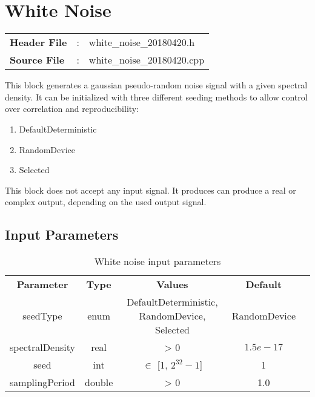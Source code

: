 \clearpage

\section{White Noise}

\begin{tcolorbox}	
	\begin{tabular}{p{2.75cm} p{0.2cm} p{10.5cm}} 	
		\textbf{Header File}   &:& white\_noise\_20180420.h \\
		\textbf{Source File}   &:& white\_noise\_20180420.cpp \\
	\end{tabular}
\end{tcolorbox}

\maketitle
This block generates a gaussian pseudo-random noise signal with a given spectral density. It can be initialized with three different seeding methods to allow control over correlation and reproducibility:

\begin{enumerate}
	\item DefaultDeterministic
	\item RandomDevice
	\item Selected
\end{enumerate}

This block does not accept any input signal. It produces can produce a real or complex output, depending on the used output signal.

\subsection*{Input Parameters}

\begin{table}[h]
	\centering
	\begin{tabular}{|c|c|c|c|c}
		\cline{1-4}
		\textbf{Parameter} & \textbf{Type} &\textbf{Values} &   \textbf{Default}& \\ \cline{1-4}
		seedType 		 & enum 	& DefaultDeterministic, RandomDevice, Selected & RandomDevice \\ \cline{1-4}
		spectralDensity  & real 	& > 0  			& $1.5e-17$ \\ \cline{1-4}
		seed 	   		 & int 		& $\in$ [1, $2^{32}-1$] 	& 1 \\ \cline{1-4}
		samplingPeriod	 & double 	& > 0 & 1.0 \\ \cline{1-4} \cline{1-4}
	\end{tabular}
	\caption{White noise input parameters}
	\label{table:noise_in_par}
\end{table}

